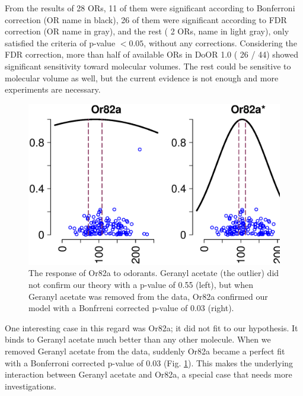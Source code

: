 \documentclass[fleqn,11pt]{wlscirep}
\newcommand{\numberofreceptors}{ 28 }
\newcommand{\bonferroni}{ 11 }
\newcommand{\fdr}{ 26 }
\newcommand{\nocorrection}{ 2 }
\begin{document}
From the results of \numberofreceptors ORs, 
\bonferroni of them were significant according to Bonferroni correction (OR name in black), 
\fdr of them were significant according to FDR correction (OR name in gray), 
and the rest (\nocorrection ORs, name in light gray), 
only satisfied the criteria of p-value $<0.05$, without any corrections.
Considering the FDR correction, 
more than half of available ORs in DoOR 1.0 (\fdr / 44) showed significant sensitivity toward molecular volumes. 
The rest could be sensitive to molecular volume as well, 
but the current evidence is not enough and more experiments are necessary. 

\begin{figure}
	\centering
	\includegraphics[width= 0.75 \textwidth]{vol-res-Or82a.eps}
	\caption{The response of Or82a to odorants.  Geranyl acetate (the outlier) did not confirm our theory with a p-value of 0.55 (left), 
	but when Geranyl acetate was removed from the data, 
	Or82a confirmed our model with a Bonfrreni corrected p-value of 0.03 (right).}
	\label{fig:Or82a}
\end{figure}
One interesting case in this regard was Or82a; it did not fit to our hypothesis. 
It binds to Geranyl acetate much better than any other molecule. 
When we removed Geranyl acetate from the data, suddenly Or82a became a perfect fit with a Bonferroni corrected p-value of 0.03 (Fig. \ref{fig:Or82a}). 
This makes the underlying interaction between Geranyl acetate and Or82a, a special case that needs more investigations.
\end{document}
